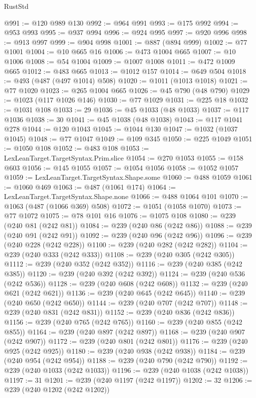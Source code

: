 \begin{lexlean}{RustStd}
\begin{coremodule}
{\begin{coremodule}
{{{{{{{{{{{{{{{{{{{{{{{{{{{{{{{{{{{{{{{{{{{{{{{{{{{{{{{{{{{{@991 := @120 @989 @130
@992 := @964 @991
@993 := @175 @992
@994 := @953 @993
@995 := @937 @994
@996 := @924 @995
@997 := @920 @996
@998 := @913 @997
@999 := @904 @998
@1001 := @887 (@894 @999)
@1002 := @77 @1001
@1004 := @10 @665 @16
@1006 := @473 @1004 @665
@1007 := @10 @1006
@1008 := @54 @1004
@1009 := @1007 @1008
@1011 := @472 @1009 @665
@1012 := @483 @665
@1013 := @1012 @157
@1014 := @649 @504
@1018 := @493 (@487 (@497 @1014) @508)
@1020 := @1011 (@1013 @1018)
@1021 := @77 @1020
@1023 := @265 @1004 @665
@1026 := @45 @790 (@48 @790)
@1029 := @1023 (@117 @1026 @146)
@1030 := @77 @1029
@1031 := @225 @18
@1032 := @1031 @108
@1033 := 29
@1036 := @45 @1033 (@48 @1033)
@1037 := @117 @1036
@1038 := 30
@1041 := @45 @1038 (@48 @1038)
@1043 := @117 @1041 @278
@1044 := @120 @1043
@1045 := @1044 @130
@1047 := @1032 (@1037 @1045)
@1048 := @77 @1047
@1049 := @109 @345
@1050 := @225 @1049
@1051 := @1050 @108
@1052 := @483 @108
@1053 := LexLeanTarget.TargetSyntax.Prim.slice
@1054 := @270 @1053
@1055 := @158 @603
@1056 := @145 @1055
@1057 := @1054 @1056
@1058 := @1052 @1057
@1059 := LexLeanTarget.TargetSyntax.Shape.some
@1060 := @488 @1059
@1061 := @1060 @469
@1063 := @487 (@1061 @174)
@1064 := LexLeanTarget.TargetSyntax.Shape.none
@1066 := @488 @1064 @101
@1070 := @1063 (@487 (@1066 @369) @508)
@1072 := @1051 (@1058 @1070)
@1073 := @77 @1072
@1075 := @78 @101 @16
@1076 := @1075 @108
@1080 := @239 (@240 @81 (@242 @81))
@1084 := @239 (@240 @86 (@242 @86))
@1088 := @239 (@240 @91 (@242 @91))
@1092 := @239 (@240 @96 (@242 @96))
@1096 := @239 (@240 @228 (@242 @228))
@1100 := @239 (@240 @282 (@242 @282))
@1104 := @239 (@240 @333 (@242 @333))
@1108 := @239 (@240 @305 (@242 @305))
@1112 := @239 (@240 @352 (@242 @352))
@1116 := @239 (@240 @385 (@242 @385))
@1120 := @239 (@240 @392 (@242 @392))
@1124 := @239 (@240 @536 (@242 @536))
@1128 := @239 (@240 @608 (@242 @608))
@1132 := @239 (@240 @621 (@242 @621))
@1136 := @239 (@240 @645 (@242 @645))
@1140 := @239 (@240 @650 (@242 @650))
@1144 := @239 (@240 @707 (@242 @707))
@1148 := @239 (@240 @831 (@242 @831))
@1152 := @239 (@240 @836 (@242 @836))
@1156 := @239 (@240 @765 (@242 @765))
@1160 := @239 (@240 @855 (@242 @855))
@1164 := @239 (@240 @897 (@242 @897))
@1168 := @239 (@240 @907 (@242 @907))
@1172 := @239 (@240 @801 (@242 @801))
@1176 := @239 (@240 @925 (@242 @925))
@1180 := @239 (@240 @938 (@242 @938))
@1184 := @239 (@240 @954 (@242 @954))
@1188 := @239 (@240 @790 (@242 @790))
@1192 := @239 (@240 @1033 (@242 @1033))
@1196 := @239 (@240 @1038 (@242 @1038))
@1197 := 31
@1201 := @239 (@240 @1197 (@242 @1197))
@1202 := 32
@1206 := @239 (@240 @1202 (@242 @1202))
}}}}}}}}}}}}}}}}}}}}}}}}}}}}}}}}}}}}}}}}}}}}}}}}}}}}}}}}}}}}
\end{coremodule}}
\end{coremodule}
\end{lexlean}
